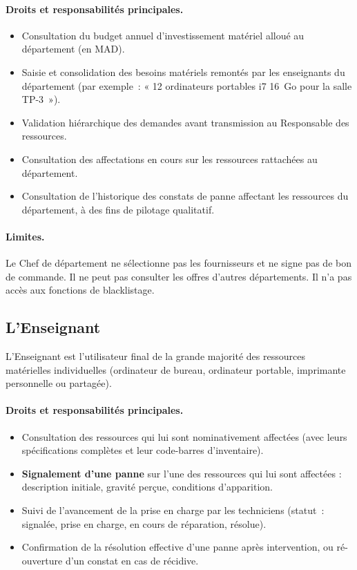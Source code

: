 \documentclass[a4paper,11pt,openany]{report}
\newcommand{\mad}{MAD}
\begin{document}
\paragraph{Droits et responsabilités principales.}
\begin{itemize}
  \item Consultation du budget annuel d'investissement matériel
    alloué au département (en \mad).
  \item Saisie et consolidation des besoins matériels remontés
    par les enseignants du département (par exemple~: « 12
    ordinateurs portables i7 16~Go pour la salle TP-3~»).
  \item Validation hiérarchique des demandes avant transmission
    au Responsable des ressources.
  \item Consultation des affectations en cours sur les ressources
    rattachées au département.
  \item Consultation de l'historique des constats de panne
    affectant les ressources du département, à des fins de
    pilotage qualitatif.
\end{itemize}

\paragraph{Limites.} Le Chef de département ne sélectionne pas
les fournisseurs et ne signe pas de bon de commande. Il ne peut
pas consulter les offres d'autres départements. Il n'a pas accès
aux fonctions de blacklistage.

\subsection{L'Enseignant}

L'Enseignant est l'utilisateur final de la grande majorité des
ressources matérielles individuelles (ordinateur de bureau,
ordinateur portable, imprimante personnelle ou partagée).

\paragraph{Droits et responsabilités principales.}
\begin{itemize}
  \item Consultation des ressources qui lui sont nominativement
    affectées (avec leurs spécifications complètes et leur
    code-barres d'inventaire).
  \item \textbf{Signalement d'une panne} sur l'une des ressources
    qui lui sont affectées : description initiale, gravité
    perçue, conditions d'apparition.
  \item Suivi de l'avancement de la prise en charge par les
    techniciens (statut~: signalée, prise en charge, en cours
    de réparation, résolue).
  \item Confirmation de la résolution effective d'une panne après
    intervention, ou ré-ouverture d'un constat en cas de récidive.
\end{itemize}
\end{document}
